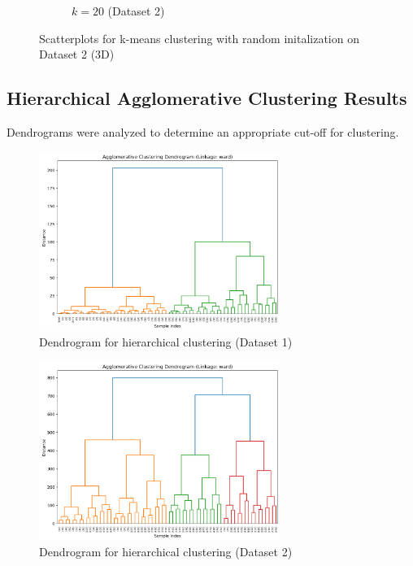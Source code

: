 \documentclass{article}
\begin{document}
\begin{figure}[h]
\begin{subfigure}[b]{0.45\textwidth}
        \caption{$k=20$ (Dataset 2)}
        \label{fig:3d_k20}
    \end{subfigure}
    \caption{Scatterplots for k-means clustering with random initalization on Dataset 2 (3D)}
    \label{fig:3d_scatterplots}
\end{figure}

\subsection{Hierarchical Agglomerative Clustering Results}
Dendrograms were analyzed to determine an appropriate cut-off for clustering.

\begin{figure}[h]
    \centering
    \includegraphics[width=0.7\textwidth]{figures/dendrogram_d0.png} %
    \caption{Dendrogram for hierarchical clustering (Dataset 1)}
    \label{fig:dendrogram1}
\end{figure}

\begin{figure}[h]
    \centering
    \includegraphics[width=0.7\textwidth]{figures/dendrogram_d1.png} %
    \caption{Dendrogram for hierarchical clustering (Dataset 2)}
    \label{fig:dendrogram2}
\end{figure}
\end{document}
